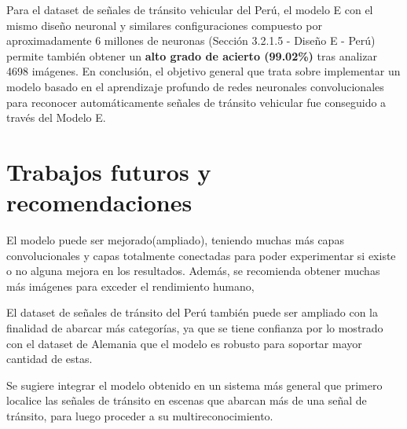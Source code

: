 	Para el dataset de señales de tránsito vehicular del Perú, el modelo E con el mismo diseño neuronal y similares configuraciones compuesto por aproximadamente 6 millones de neuronas (Sección 3.2.1.5 - Diseño E - Perú) permite también obtener un {\bf alto grado de acierto (99.02\%)} tras analizar 4698 imágenes. 
\vskip 0.2cm
	En conclusión, el objetivo general que trata sobre implementar un modelo basado en el aprendizaje profundo de redes neuronales convolucionales para reconocer automáticamente señales de tránsito vehicular fue conseguido a través del Modelo E.	 


\section{Trabajos futuros y recomendaciones}


	El modelo puede ser mejorado(ampliado), teniendo muchas más capas convolucionales y capas totalmente conectadas para poder experimentar si existe o no alguna mejora en los resultados. Además, se recomienda obtener muchas más imágenes para exceder el rendimiento humano, \citep{Goodfellow-et-al-2016}

	El dataset de señales de tránsito del Perú también puede ser ampliado con la finalidad de abarcar más categorías, ya que se tiene confianza por lo mostrado con el dataset de Alemania que el modelo es robusto para soportar mayor cantidad de estas.
	
	Se sugiere integrar el modelo obtenido en un sistema más general que primero localice las señales de tránsito en escenas que abarcan más de una señal de tránsito, para luego proceder a su multireconocimiento.

\newpage